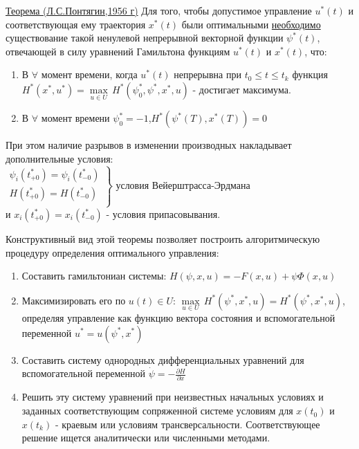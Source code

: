 \documentclass[preprint,russian,a5paper,10pt,twoside,mediummath]{ncc}
\begin{document}
\underline{Теорема (Л.С.Понтягин,1956 г)} Для того, чтобы допустимое управление ${{u}^{*}}\left( t \right)$ и соответствующая ему траектория ${{x}^{*}}\left( t \right)$ были оптимальными \underline{необходимо} существование такой ненулевой непрерывной векторной функции ${{\psi }^{*}}\left( t \right)$, отвечающей в силу уравнений Гамильтона функциям  ${{u}^{*}}\left( t \right)$ и ${{x}^{*}}\left( t \right)$, что:
\begin{enumerate}
\item В $\forall $ момент времени, когда ${{u}^{*}}\left( t \right)$ непрерывна при ${{t}_{0}}\le t\le {{t}_{k}}$ функция ${{H}^{*}}\left( {{x}^{*}},{{u}^{*}} \right)=\underset{u\in U}{\mathop{\max }}\,{{H}^{*}}\left( \psi _{0}^{*},{{\psi }^{*}},{{x}^{*}},u \right)$ - достигает максимума.
\item В $\forall $ момент времени $\psi _{0}^{*}=-1$,${{H}^{*}}\left( {{\psi }^{*}}\left( T \right),{{x}^{*}}\left( T \right) \right)=0$
\end{enumerate}
При этом наличие разрывов в изменении производных накладывает дополнительные условия:
\\$\left. \begin{array}{*{35}{l}}
   {{\psi }_{i}}\left( t_{+0}^{*} \right)={{\psi }_{i}}\left( t_{-0}^{*} \right)  \\
   H\left( t_{+0}^{*} \right)=H\left( t_{-0}^{*} \right)  \\
\end{array} \right\}$ условия Вейерштрасса-Эрдмана
 \\и ${{x}_{i}}\left( t_{+0}^{*} \right)={{x}_{i}}\left( t_{-0}^{*} \right)$ - условия припасовывания.
\par Конструктивный вид этой теоремы позволяет построить алгоритмическую процедуру определения оптимального управления:
\begin{enumerate}
\item Составить гамильтониан системы: $H\left( \psi ,x,u \right)=-F\left( x,u \right)+\psi \Phi \left( x,u \right)$
\item Максимизировать его по $u\left( t \right)\in U$: $\underset{u\in U}{\mathop{\max }}\,{{H}^{*}}\left( {{\psi }^{*}},{{x}^{*}},u \right)={{H}^{*}}\left( {{\psi }^{*}},{{x}^{*}},u \right)$, определяя управление как функцию вектора состояния и вспомогательной переменной ${{u}^{*}}=u\left( {{\psi }^{*}},{{x}^{*}} \right)$
\item Составить систему однородных дифференциальных уравнений для вспомогательной переменной $\dot{\psi }=-\frac{\partial H}{\partial x}$
\item Решить эту систему уравнений при неизвестных начальных условиях и заданных соответствующим сопряженной системе условиям для $x\left( {{t}_{0}} \right)$ и $x\left( {{t}_{k}} \right)$ - краевым или условиям трансверсальности. Соответствующее решение ищется аналитически или численными методами.
\end{enumerate} 
\end{document}

